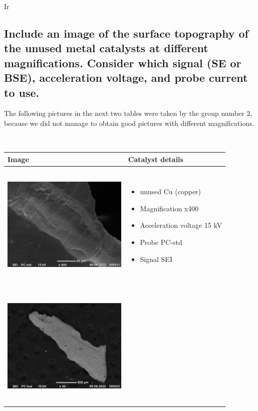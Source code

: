 Ir\documentclass{article}
\begin{document}
\subsection{Include an image of the surface topography of the unused metal catalysts at
different magnifications. Consider which signal (SE or BSE), acceleration
voltage, and probe current to use.}
The following pictures in the next two tables were taken by the group number 2, because we did not manage to obtain good pictures with different magnifications.
\begin{center}
\begin{longtable}
\label{tab:long} \\
  \centering
  \begin{tabular}{ | m{7cm} | m{7cm} | }
    \hline
    Image & Catalyst details  \\ \hline
    \begin{minipage}{.3\textwidth}
      \includegraphics[width=60mm, height=60mm]{pictures/cu1.jpg}
    \end{minipage}
    &
      \begin{itemize}
        \item unused Cu (copper)
        \item Magnification x400
        \item Acceleration voltage 15 kV
        \item Probe PC-std 
        \item Signal SEI 
      \end{itemize} \\ \hline
      \\
    \begin{minipage}{.3\textwidth}
      \includegraphics[width=60mm, height=60mm]{pictures/cu2.jpg}

\end{minipage}
\end{tabular}
\end{longtable}
\end{center}
\end{document}
